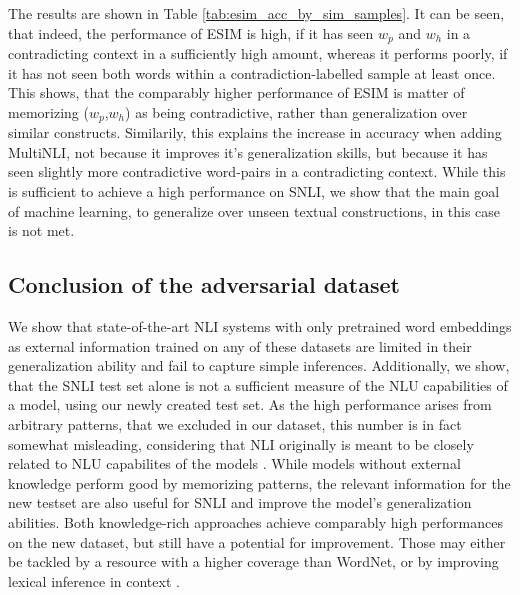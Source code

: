 The results are shown in Table \ref{tab:esim_acc_by_sim_samples}.
It can be seen, that indeed, the performance of \ac{ESIM} is high, if it has seen $w_p$ and $w_h$ in a contradicting context in a sufficiently high amount, whereas it performs poorly, if it has not seen both words within a contradiction-labelled sample at least once. This shows, that the comparably higher performance of ESIM is matter of memorizing ($w_p$,$w_h$) as being contradictive, rather than generalization over similar constructs. Similarily, this explains the increase in accuracy when adding \ac{MultiNLI}, not because it improves it's generalization skills, but because it has seen slightly more contradictive word-pairs in a contradicting context. While this is sufficient to achieve a high performance on \ac{SNLI}, we show that the main goal of machine learning, to generalize over unseen textual constructions, in this case is not met. 

\subsection{Conclusion of the adversarial dataset}
We show that state-of-the-art NLI systems with only pretrained word embeddings as external information trained on any of these datasets are limited in their generalization ability and fail to capture simple inferences. Additionally, we show, that the SNLI test set alone is not a sufficient measure of the \ac{NLU} capabilities of a model, using our newly created test set. As the high performance arises from arbitrary patterns, that we excluded in our dataset, this number is in fact somewhat misleading, considering that \ac{NLI} originally is meant to be closely related to \ac{NLU} capabilites of the models \citep{williams2017broad}. While models without external knowledge perform good by memorizing patterns, the relevant information for the new testset are also useful for \ac{SNLI} and improve the model's generalization abilities. Both knowledge-rich approaches achieve comparably high performances on the new dataset, but still have a potential for improvement. Those may either be tackled by a resource with a higher coverage than WordNet, or by improving lexical inference in context \citep{shwartz2016adding}.